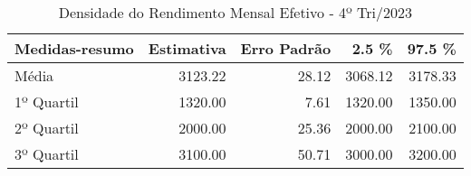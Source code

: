 \begin{table}[ht]
\centering
\begin{tabular}{lrrrr}
  \hline
Medidas-resumo & Estimativa & Erro Padrão & 2.5 \% & 97.5 \% \\ 
  \hline
Média & 3123.22 & 28.12 & 3068.12 & 3178.33 \\ 
  1º Quartil & 1320.00 & 7.61 & 1320.00 & 1350.00 \\ 
  2º Quartil & 2000.00 & 25.36 & 2000.00 & 2100.00 \\ 
  3º Quartil & 3100.00 & 50.71 & 3000.00 & 3200.00 \\ 
   \hline
\end{tabular}
\caption{Densidade do Rendimento Mensal Efetivo -
            4º Tri/2023} 
\label{sum}
\end{table}

